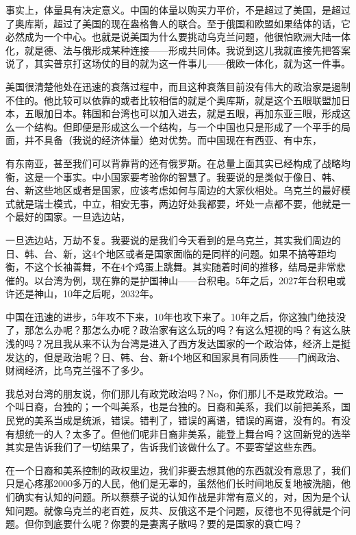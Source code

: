 \documentclass[UTF8, 12pt, a4paper]{ctexrep}
\begin{document}
事实上，体量具有决定意义。中国的体量以购买力平价，不是超过了美国，是超过了奥库斯，超过了美国的现在盎格鲁人的联合。至于俄国和欧盟如果结体的话，它必然成为一个中心。也就是说美国为什么要挑动乌克兰问题，他很怕欧洲大陆一体化，就是德、法与俄形成某种连接——形成共同体。我说到这儿我就直接先把答案说了，其实普京打这场仗的目的就为这一件事儿——俄欧一体化，就为这一件事。

美国很清楚他处在迅速的衰落过程中，而且这种衰落目前没有伟大的政治家是遏制不住的。他比较可以依靠的或者比较相信的就是个奥库斯，就是这个五眼联盟加日本，五眼加日本。韩国和台湾也可以加入进去，就是五眼，再加东亚三眼，形成这么一个结构。但即便是形成这么一个结构，与一个中国也只是形成了一个平手的局面，并不具备（我说的经济体量）绝对优势。而中国现在有西亚、有中东，

有东南亚，甚至我们可以背靠背的还有俄罗斯。在总量上面其实已经构成了战略均衡，这是一个事实。中小国家要考验你的智慧了。我要说的是类似于像日、韩、台、新这些地区或者是国家，应该考虑如何与周边的大家伙相处。乌克兰的最好模式就是瑞士模式，中立，相安无事，两边好处我都要，坏处一点都不要，他就是一个最好的国家。一旦选边站，

一旦选边站，万劫不复。我要说的是我们今天看到的是乌克兰，其实我们周边的日、韩、台、新，这4个地区或者是国家面临的是同样的问题。如果不搞等距均衡，不这个长袖善舞，不在4个鸡蛋上跳舞。其实随着时间的推移，结局是非常悲催的。以台湾为例，现在靠的是护国神山——台积电。5年之后，2027年台积电或许还是神山，10年之后呢，2032年。

中国在迅速的进步，5年攻不下来，10年也攻下来了。10年之后，你这独门绝技没了，那怎么办呢？那怎么办呢？政治家有这么玩的吗？有这么短视的吗？有这么肤浅的吗？况且我从来不认为台湾是进入了西方发达国家的一个政治体，经济上是挺发达的，但是政治呢？日、韩、台、新4个地区和国家具有同质性——门阀政治、财阀经济，比乌克兰强不了多少。

我总对台湾的朋友说，你们那儿有政党政治吗？No，你们那儿不是政党政治。一个叫日裔，台独的；一个叫美系，也是台独的。日裔和美系，我们以前把美系，国民党的美系当成是统派，错误。错判了，错误的离谱，错误的离谱，没有的。有没有想统一的人？太多了。但他们呢非日裔非美系，能登上舞台吗？这回新党的选举其实是告诉我们了一切结果了，告诉我们该做什么了。不要寄望这些东西。

在一个日裔和美系控制的政权里边，我们非要去想其他的东西就没有意思了，我们只是心疼那2000多万的人民，他们是无辜的，虽然他们长时间地反复地被洗脑，他们确实有认知的问题。所以蔡蔡子说的认知作战是非常有意义的，对，因为是个认知问题。就像乌克兰的老百姓，反共、反俄这不是个问题，反德也不见得就是个问题。但你到底要什么呢？你要的是妻离子散吗？要的是国家的衰亡吗？
\end{document}
